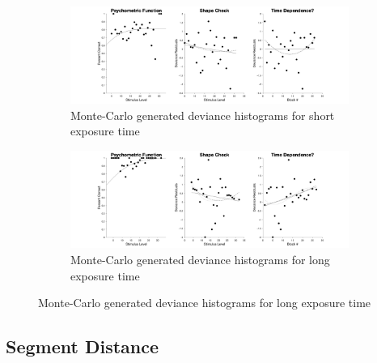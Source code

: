 \documentclass{article}
\begin{document}
\begin{figure}[!hb]
    \begin{subfigure}{\textwidth}
        \centering
        \includegraphics[width = \linewidth]{Thesis/plots/gof/segSize/segSize_js_short_deviance.png}
        \caption{Monte-Carlo generated deviance histograms for short exposure time}
    \end{subfigure}
    \begin{subfigure}{\textwidth}
        \centering
        \includegraphics[width = \linewidth]{Thesis/plots/gof/segSize/segSize_js_long_deviance.png}
        \caption{Monte-Carlo generated deviance histograms for long exposure time}
    \end{subfigure}
\end{figure}

\clearpage

\subsection{Segment Distance}
\end{document}
